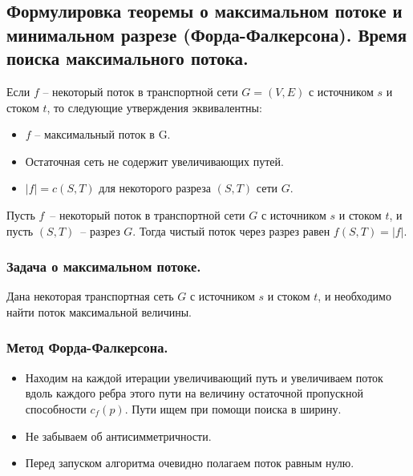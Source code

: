 \documentclass[a4paper,14pt]{article}
\begin{document}
    \subsection{Формулировка теоремы о максимальном потоке и минимальном разрезе (Форда-Фалкерсона). Время поиска максимального потока.}
    \label{subsec:ford_fulkerson}
    \begin{theorem}
        Если $f$ – некоторый поток в транспортной сети $G = (V,E)$ с
источником $s$ и стоком $t$, то следующие утверждения
эквивалентны:
        \begin{itemize}
            \item $f$ – максимальный поток в G.
            \item Остаточная сеть не содержит увеличивающих путей.
            \item $|f| = c(S,T)$ для некоторого разреза $(S,T)$ сети $G$.
        \end{itemize}
    \end{theorem}
    \begin{lemma}
        Пусть $f$~-- некоторый поток в транспортной сети $G$ с источником $s$ и стоком $t$, и пусть $(S, T)$~-- разрез $G$. Тогда чистый поток через разрез равен $f(S, T) = |f|$.
    \end{lemma}
    \subsubsection*{Задача о максимальном потоке.}
    \begin{problem}
        Дана некоторая транспортная сеть $G$ с источником $s$ и стоком $t$, и
необходимо найти поток максимальной величины.
    \end{problem}
    \subsubsection*{Метод Форда-Фалкерсона.}
    \begin{itemize}
        \item Находим на каждой итерации увеличивающий путь и
        увеличиваем поток вдоль каждого ребра этого пути на
        величину остаточной пропускной способности $c_f(p)$. Пути ищем
        при помощи поиска в ширину.
        \item Не забываем об антисимметричности.
        \item Перед запуском алгоритма очевидно полагаем поток равным
        нулю.
    \end{itemize}
\end{document}
